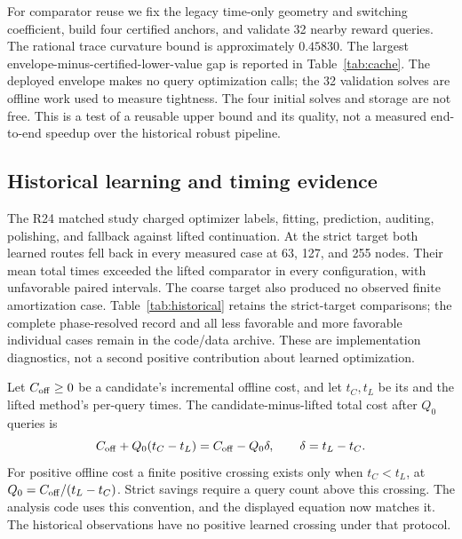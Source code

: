 \documentclass[11pt,letterpaper]{article}
\theoremstyle{definition}\newtheorem{assumption}[theorem]{Assumption}
\begin{document}
For comparator reuse we fix the legacy time-only geometry and switching coefficient, build four certified anchors, and validate 32 nearby reward queries. The rational trace curvature bound is approximately $0.45830$. The largest envelope-minus-certified-lower-value gap is reported in Table~\ref{tab:cache}. The deployed envelope makes no query optimization calls; the 32 validation solves are offline work used to measure tightness. The four initial solves and storage are not free. This is a test of a reusable upper bound and its quality, not a measured end-to-end speedup over the historical robust pipeline.




\subsection{Historical learning and timing evidence}
The R24 matched study charged optimizer labels, fitting, prediction, auditing, polishing, and fallback against lifted continuation. At the strict target both learned routes fell back in every measured case at 63, 127, and 255 nodes. Their mean total times exceeded the lifted comparator in every configuration, with unfavorable paired intervals. The coarse target also produced no observed finite amortization case. Table~\ref{tab:historical} retains the strict-target comparisons; the complete phase-resolved record and all less favorable and more favorable individual cases remain in the code/data archive. These are implementation diagnostics, not a second positive contribution about learned optimization.

Let $C_{\rm off}\geq0$ be a candidate's incremental offline cost, and let $t_C,t_L$ be its and the lifted method's per-query times. The candidate-minus-lifted total cost after $Q_0$ queries is
\begin{equation}\label{eq:amortization}
 C_{\rm off}+Q_0(t_C-t_L)=C_{\rm off}-Q_0\delta,
 \qquad \delta=t_L-t_C.
\end{equation}
For positive offline cost a finite positive crossing exists only when $t_C<t_L$, at $Q_0=C_{\rm off}/(t_L-t_C)$. Strict savings require a query count above this crossing. The analysis code uses this convention, and the displayed equation now matches it. The historical observations have no positive learned crossing under that protocol.

\end{document}
